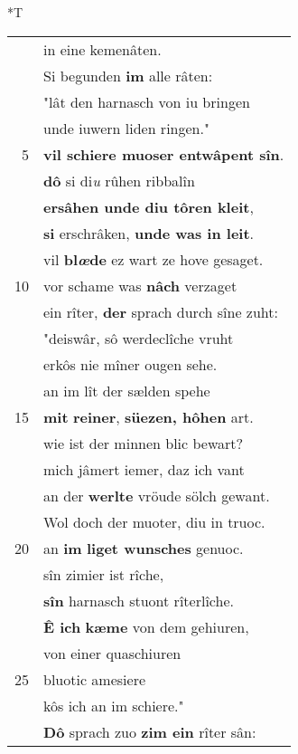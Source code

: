 \documentclass[8pt,a4paper,notitlepage]{article}
\begin{document}
\begin{table}[ht]
\begin{minipage}[t]{0.5\linewidth}
\end{minipage}
\hspace{0.5cm}
\begin{minipage}[t]{0.5\linewidth}
\small
\begin{center}*T
\end{center}
\begin{tabular}{rl}
 & in eine kemenâten.\\ 
 & Si begunden \textbf{im} alle râten:\\ 
 & "lât den harnasch von iu bringen\\ 
 & unde iuwern liden ringen."\\ 
5 & \textbf{vil schiere muoser entwâpent sîn}.\\ 
 & \textbf{dô} si di\textit{u} rûhen ribbalîn\\ 
 & \textbf{ersâhen unde diu tôren kleit},\\ 
 & \textbf{si} erschrâken, \textbf{unde was in leit}.\\ 
 & vil \textbf{bl\textit{œ}de} ez wart ze hove gesaget.\\ 
10 & vor schame was \textbf{nâch} verzaget\\ 
 & ein rîter, \textbf{der} sprach durch sîne zuht:\\ 
 & "deiswâr, sô werdeclîche vruht\\ 
 & erkôs nie mîner ougen sehe.\\ 
 & an im lît der sælden spehe\\ 
15 & \textbf{mit} \textbf{reiner}, \textbf{süezen, hôhen} art.\\ 
 & wie ist der minnen blic bewart?\\ 
 & mich jâmert iemer, daz ich vant\\ 
 & an der \textbf{werlte} vröude sölch gewant.\\ 
 & Wol doch der muoter, diu in truoc.\\ 
20 & an \textbf{im} \textbf{liget wunsches} genuoc.\\ 
 & sîn zimier ist rîche,\\ 
 & \textbf{sîn} harnasch stuont rîterlîche.\\ 
 & \textbf{Ê ich} \textbf{kæme} von dem gehiuren,\\ 
 & von einer quaschiuren\\ 
25 & bluotic amesiere\\ 
 & kôs ich an im schiere."\\ 
 & \textbf{Dô} sprach zuo \textbf{zim ein} rîter sân:\\ 

\end{tabular}
\end{minipage}
\end{table}
\end{document}
